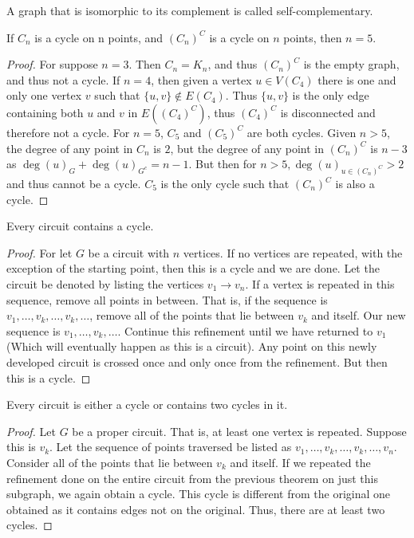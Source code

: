         \begin{definition}
        A graph that is isomorphic to its complement is called self-complementary.
        \end{definition}
        \begin{theorem}
        If $C_n$ is a cycle on n points, and $(C_n)^C$ is a cycle on $n$ points, then $n = 5$.
        \end{theorem}
        \begin{proof}
        For suppose $n=3$. Then $C_n = K_n$, and thus $(C_n)^C$ is the empty graph, and thus not a cycle. If $n = 4$, then given a vertex $u\in V(C_4)$ there is one and only one vertex $v$ such that $\{u,v\} \notin E(C_4)$. Thus $\{u,v\}$ is the only edge containing both $u$ and $v$ in $E((C_4)^C)$, thus $(C_4)^C$ is disconnected and therefore not a cycle. For $n=5$, $C_5$ and $(C_5)^C$ are both cycles. Given $n>5$, the degree of any point in $C_{n}$ is $2$, but the degree of any point in $(C_n)^C$ is $n-3$ as $\deg(u)_G + \deg(u)_{G^c} = n-1$. But then for $n>5, \deg(u)_{u\in (C_n)^C} > 2$ and thus cannot be a cycle. $C_5$ is the only cycle such that $(C_n)^C$ is also a cycle.
        \end{proof}
        \begin{theorem}
        Every circuit contains a cycle.
        \end{theorem}
        \begin{proof}
        For let $G$ be a circuit with $n$ vertices. If no vertices are repeated, with the exception of the starting point, then this is a cycle and we are done. Let the circuit be denoted by listing the vertices $v_1 \rightarrow v_n$. If a vertex is repeated in this sequence, remove all points in between. That is, if the sequence is $v_1,\hdots, v_k,\hdots, v_k, \hdots$, remove all of the points that lie between $v_k$ and itself. Our new sequence is $v_1, \hdots, v_k, \hdots$. Continue this refinement until we have returned to $v_1$ (Which will eventually happen as this is a circuit). Any point on this newly developed circuit is crossed once and only once from the refinement. But then this is a cycle.
        \end{proof}
        \begin{theorem}
        Every circuit is either a cycle or contains two cycles in it.
        \end{theorem}
        \begin{proof}
        Let $G$ be a proper circuit. That is, at least one vertex is repeated. Suppose this is $v_k$. Let the sequence of points traversed be listed as $v_1,\hdots, v_k, \hdots,v_k, \hdots, v_n$. Consider all of the points that lie between $v_k$ and itself. If we repeated the refinement done on the entire circuit from the previous theorem on just this subgraph, we again obtain a cycle. This cycle is different from the original one obtained as it contains edges not on the original. Thus, there are at least two cycles.
        \end{proof}
